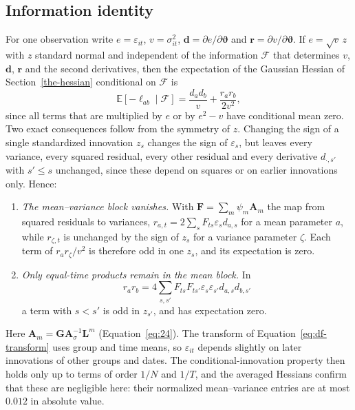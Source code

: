 \documentclass[12pt]{article}
\begin{document}
\subsection{Information identity}
For one observation write $e=\varepsilon_{it}$, $v=\sigma_{it}^2$, $\mathbf d=\partial e/\partial\boldsymbol\vartheta$ and $\mathbf r=\partial v/\partial\boldsymbol\vartheta$. If $e=\sqrt v\,z$ with $z$ standard normal and independent of the information $\mathcal F$ that determines $v$, $\mathbf d$, $\mathbf r$ and the second derivatives, then the expectation of the Gaussian Hessian of Section~\ref{the-hessian} conditional on $\mathcal F$ is
\begin{equation}
\mathbb E[-\ell_{ab}\mid\mathcal F]=\frac{d_a d_b}{v}+\frac{r_a r_b}{2v^2},
\label{eq:conditional-information}
\end{equation}
since all terms that are multiplied by $e$ or by $e^2-v$ have conditional mean zero. Two exact consequences follow from the symmetry of $z$. Changing the sign of a single standardized innovation $z_s$ changes the sign of $\varepsilon_s$, but leaves every variance, every squared residual, every other residual and every derivative $d_{\cdot,s'}$ with $s'\le s$ unchanged, since these depend on squares or on earlier innovations only. Hence:
\begin{enumerate}[nosep]
\item \emph{The mean--variance block vanishes.} With $\mathbf F=\sum_m\psi_m\mathbf A_m$ the map from squared residuals to variances, $r_{a,t}=2\sum_s F_{ts}\varepsilon_s d_{a,s}$ for a mean parameter $a$, while $r_{\zeta,t}$ is unchanged by the sign of $z_s$ for a variance parameter $\zeta$. Each term of $r_ar_\zeta/v^2$ is therefore odd in one $z_s$, and its expectation is zero.
\item \emph{Only equal-time products remain in the mean block.} In
\[
r_ar_b=4\sum_{s,s'}F_{ts}F_{ts'}\varepsilon_s\varepsilon_{s'}d_{a,s}d_{b,s'}
\]
a term with $s<s'$ is odd in $z_{s'}$, and has expectation zero.
\end{enumerate}
Here $\mathbf A_m=\mathbf{GA}_\sigma^{-1}\mathbf L^m$ (Equation~\ref{eq:24}). The transform of Equation~\ref{eq:df-transform} uses group and time means, so $\varepsilon_{it}$ depends slightly on later innovations of other groups and dates. The conditional-innovation property then holds only up to terms of order $1/N$ and $1/T$, and the averaged Hessians confirm that these are negligible here: their normalized mean--variance entries are at most $0.012$ in absolute value.
\end{document}
